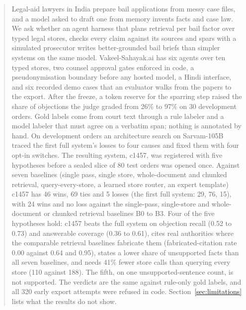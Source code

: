 \begin{abstract}
Legal-aid lawyers in India prepare bail applications from messy case files, and a model asked to draft one from memory invents facts and case law. We ask whether an agent harness that plans retrieval per bail factor over typed legal stores, checks every claim against its sources and spars with a simulated prosecutor writes better-grounded bail briefs than simpler systems on the same model. Vakeel-Sahayak.ai has six agents over ten typed stores, two counsel approval gates enforced in code, a pseudonymisation boundary before any hosted model, a Hindi interface, and six recorded demo cases that an evaluator walks from the papers to the export. After the freeze, a token reserve for the sparring step raised the share of objections the judge graded from 26\% to 97\% on 30 development orders. Gold labels come from court text through a rule labeler and a model labeler that must agree on a verbatim span; nothing is annotated by hand. On development orders an architecture search on Sarvam-105B traced the first full system's losses to four causes and fixed them with four opt-in switches. The resulting system, c1457, was registered with five hypotheses before a sealed slice of 80 test orders was opened once. Against seven baselines (single pass, single store, whole-document and chunked retrieval, query-every-store, a learned store router, an expert template) c1457 has 46 wins, 69 ties and 5 losses (the first full system: 29, 76, 15), with 24 wins and no loss against the single-pass, single-store and whole-document or chunked retrieval baselines B0 to B3. Four of the five hypotheses hold: c1457 beats the full system on objection recall (0.52 to 0.73) and answerable coverage (0.36 to 0.61), cites real authorities where the comparable retrieval baselines fabricate them (fabricated-citation rate 0.00 against 0.64 and 0.95), states a lower share of unsupported facts than all seven baselines, and needs 41\% fewer store calls than querying every store (110 against 188). The fifth, on one unsupported-sentence count, is not supported. The verdicts are the same against rule-only gold labels, and all 320 early export attempts were refused in code. Section~\ref{sec:limitations} lists what the results do not show.
\end{abstract}
